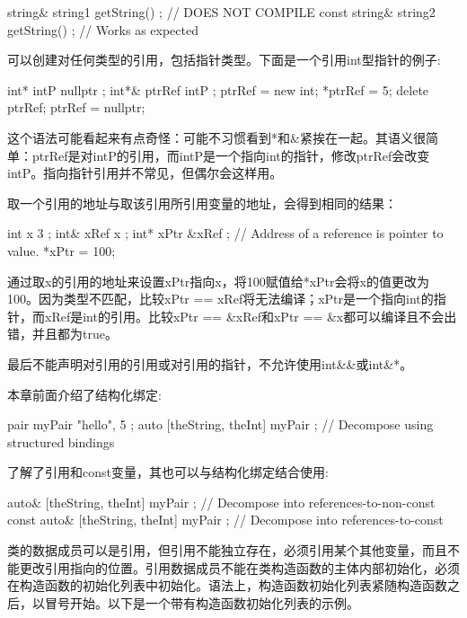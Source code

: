 \begin{cpp}
string& string1 { getString() }; // DOES NOT COMPILE
const string& string2 { getString() }; // Works as expected
\end{cpp}


可以创建对任何类型的引用，包括指针类型。下面是一个引用int型指针的例子:

\begin{cpp}
int* intP { nullptr };
int*& ptrRef { intP };
ptrRef = new int;
*ptrRef = 5;
delete ptrRef; ptrRef = nullptr;
\end{cpp}

这个语法可能看起来有点奇怪：可能不习惯看到*和\&紧挨在一起。其语义很简单：ptrRef是对intP的引用，而intP是一个指向int的指针，修改ptrRef会改变intP。指向指针引用并不常见，但偶尔会这样用。

取一个引用的地址与取该引用所引用变量的地址，会得到相同的结果：

\begin{cpp}
int x { 3 };
int& xRef { x };
int* xPtr { &xRef }; // Address of a reference is pointer to value.
*xPtr = 100;
\end{cpp}

通过取x的引用的地址来设置xPtr指向x，将100赋值给*xPtr会将x的值更改为100。因为类型不匹配，比较xPtr == xRef将无法编译；xPtr是一个指向int的指针，而xRef是int的引用。比较xPtr == \&xRef和xPtr == \&x都可以编译且不会出错，并且都为true。

最后不能声明对引用的引用或对引用的指针，不允许使用int\&\&或int\&*。


本章前面介绍了结构化绑定:

\begin{cpp}
pair myPair { "hello", 5 };
auto [theString, theInt] { myPair }; // Decompose using structured bindings
\end{cpp}

了解了引用和const变量，其也可以与结构化绑定结合使用:

\begin{cpp}
auto& [theString, theInt] { myPair }; // Decompose into references-to-non-const
const auto& [theString, theInt] { myPair }; // Decompose into references-to-const
\end{cpp}


类的数据成员可以是引用，但引用不能独立存在，必须引用某个其他变量，而且不能更改引用指向的位置。引用数据成员不能在类构造函数的主体内部初始化，必须在构造函数的初始化列表中初始化。语法上，构造函数初始化列表紧随构造函数之后，以冒号开始。以下是一个带有构造函数初始化列表的示例。

